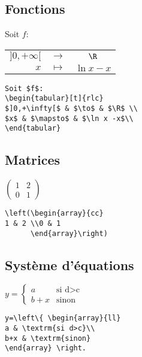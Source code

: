 \documentclass[12pt,french,oneside]{report}
\begin{document}
\begin{spacing}{1.2}
\subsection{Fonctions}

\begin{center}
Soit $f$:
\begin{tabular}[t]{rlc}
$]0,+\infty[$ & $\to$ & $\R$ \\
$x$ & $\mapsto$ & $\ln x -x$\\
\end{tabular}
\end{center}

\begin{verbatim}
Soit $f$:
\begin{tabular}[t]{rlc}
$]0,+\infty[$ & $\to$ & $\R$ \\
$x$ & $\mapsto$ & $\ln x -x$\\
\end{tabular}
\end{verbatim}

\subsection{Matrices}

\begin{center}
$\left(\begin{array}{cc}
1 & 2 \\0 & 1
      \end{array}\right)$
\end{center}

\begin{verbatim}
\left(\begin{array}{cc}
1 & 2 \\0 & 1
      \end{array}\right)
\end{verbatim}  

\subsection{Système d'équations}

\begin{center}
$y=\left\{ \begin{array}{ll}
a & \textrm{si d$>$c}\\
b+x & \textrm{sinon}
\end{array} \right.$
\end{center}

\begin{verbatim}
y=\left\{ \begin{array}{ll}
a & \textrm{si d>c}\\
b+x & \textrm{sinon}
\end{array} \right.
\end{verbatim}


\end{spacing}
\end{document}
